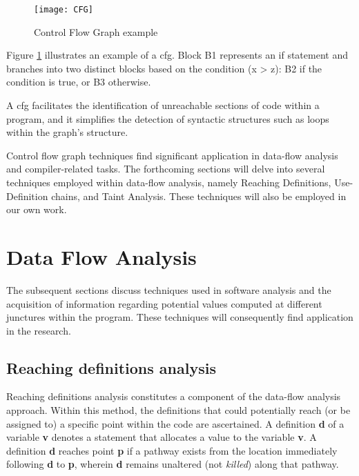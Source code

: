 \begin{figure}[ht]
	\centering
	\texttt{[image: CFG]}
	  \caption{Control Flow Graph example}
  \label{fig:CFG_EX}
\end{figure}

Figure \ref{fig:CFG_EX} illustrates an example of a \gls{cfg}. Block B1 represents an if statement and branches into two distinct blocks based on the condition (x > z): B2 if the condition is true, or B3 otherwise.

A \gls{cfg} facilitates the identification of unreachable sections of code within a program, and it simplifies the detection of syntactic structures such as loops within the graph's structure.

Control flow graph techniques find significant application in data-flow analysis and compiler-related tasks. The forthcoming sections will delve into several techniques employed within data-flow analysis, namely Reaching Definitions, Use-Definition chains, and Taint Analysis. These techniques will also be employed in our own work.


\section{Data Flow Analysis} %
\label{sec: Data_Flow_Analysis}

The subsequent sections discuss techniques used in software analysis and the acquisition of information regarding potential values computed at different junctures within the program. These techniques will consequently find application in the research.

\subsection{Reaching definitions analysis} %
\label{sec:Reaching_definitions_analysis}

Reaching definitions analysis \cite{Kronjee2018} constitutes a component of the data-flow analysis approach. Within this method, the definitions that could potentially reach (or be assigned to) a specific point within the code are ascertained. A definition \textbf{d} of a variable \textbf{v} denotes a statement that allocates a value to the variable \textbf{v}. A definition \textbf{d} reaches point \textbf{p} if a pathway exists from the location immediately following \textbf{d} to \textbf{p}, wherein \textbf{d} remains unaltered (not \textit{killed}) along that pathway. 

